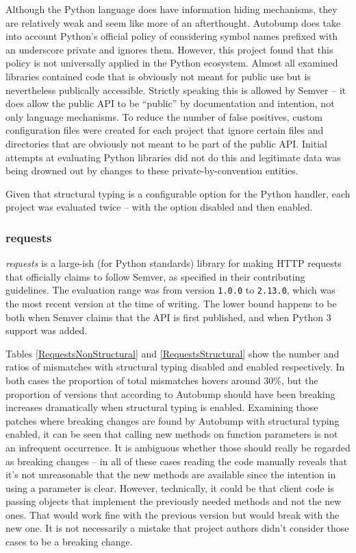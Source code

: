 \documentclass{l4proj}
\newcommand\genericstyle{\lstset{basicstyle=\ttm}}
\newcommand\codeinline[1]{{\genericstyle\lstinline!#1!}}
\begin{document}
Although the Python language does have information hiding mechanisms,
they are relatively weak and seem like more of an afterthought.
Autobump does take into account Python's official policy of
considering symbol names prefixed with an underscore private and
ignores them. However, this project found that this policy is not
universally applied in the Python ecosystem. Almost all examined
libraries contained code that is obviously not meant for public use
but is nevertheless publically accessible. Strictly speaking this is
allowed by Semver -- it does allow the public API to be ``public'' by
documentation and intention, not only language mechanisms. To reduce
the number of false positives, custom configuration files were created
for each project that ignore certain files and directories that are
obviously not meant to be part of the public API. Initial attempts at
evaluating Python libraries did not do this and legitimate data was
being drowned out by changes to these private-by-convention entities.

Given that structural typing is a configurable option for the Python
handler, each project was evaluated twice -- with the option disabled
and then enabled.

\subsubsection{requests}

\textit{requests} is a large-ish (for Python standards) library for
making HTTP requests that officially claims to follow Semver, as
specified in their contributing guidelines. The evaluation range was
from version \codeinline{1.0.0} to \codeinline{2.13.0}, which was the
most recent version at the time of writing. The lower bound happens to
be both when Semver claims that the API is first published, and when
Python 3 support was added.

Tables \ref{RequestsNonStructural} and \ref{RequestsStructural} show
the number and ratios of mismatches with structural typing disabled
and enabled respectively. In both cases the proportion of total
mismatches hovers around 30\%, but the proportion of versions that
according to Autobump should have been breaking increases dramatically
when structural typing is enabled. Examining those patches where
breaking changes are found by Autobump with structural typing enabled,
it can be seen that calling new methods on function parameters is not
an infrequent occurrence. It is ambiguous whether those should really
be regarded as breaking changes -- in all of these cases reading the
code manually reveals that it's not unreasonable that the new methods
are available since the intention in using a parameter is clear.
However, technically, it could be that client code is passing objects
that implement the previously needed methods and not the new ones.
That would work fine with the previous version but would break with
the new one. It is not necessarily a mistake that project authors
didn't consider those cases to be a breaking change.
\end{document}

